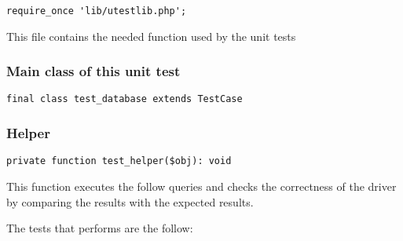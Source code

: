 \documentclass[a4paper]{article}
\begin{document}
\begin{lstlisting}
require_once 'lib/utestlib.php';
\end{lstlisting}

This file contains the needed function used by the unit tests

\hypertarget{toc120}{}
\subsubsection{Main class of this unit test}

\begin{lstlisting}
final class test_database extends TestCase
\end{lstlisting}

\hypertarget{toc121}{}
\subsubsection{Helper}

\begin{lstlisting}
private function test_helper($obj): void
\end{lstlisting}

This function executes the follow queries and checks the correctness
of the driver by comparing the results with the expected results.

The tests that performs are the follow:
\end{document}
